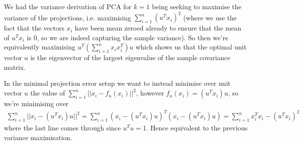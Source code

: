 %
%
\begin{answer}
We had the variance derivation of PCA for $k=1$ being seeking to maximise the variance of the projections, i.e. maximising $\sum_{i=1}^n (u^T x_i)^2$ (where we use the fact that the vectors $x_i$ have been mean zeroed already to ensure that the mean of $u^T x_i$ is 0, so we are indeed capturing the sample variance). So then we're equivalently maximising $u^T (\sum_{i=1}^n x_i x_i^T) u$  which shows us that the optimal unit vector $u$ is the eigenvector of the largest eigenvalue of the sample covariance matrix.
\linebreak

In the minimal projection error setup we want to instead minimise over unit vector $u$ the value of $\sum_{i=1}^n || x_i - f_u (x_i)||^2$, however $f_u(x_i) = (u^T x_i)u$, so we're minimising over
\begin{align*}
  \sum_{i=1}^n ||x_i - (u^T x_i) u ||^2 
= \sum_{i=1}^n (x_i - (u^T x_i) u)^T (x_i - (u^T x_i) u)
= \sum_{i=1}^n x_i^T x_i - (u^T x_i)^2
\end{align*}
where the last line comes through since $u^T u = 1$. Hence equivalent to the previous variance maximisation.
\end{answer}
%
